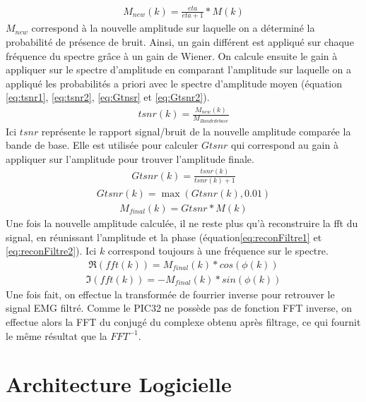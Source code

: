 \documentclass[letterpaper, twoside, 12pt, memoire, creativecommons, hyperref]{thETS}
\begin{document}
\begin{align}\label{eq:newMagEta}
   M_{new}(k) = \frac{eta}{eta+1} * M(k)
\end{align}
$M_{new}$ correspond à la nouvelle amplitude sur laquelle on a déterminé la probabilité de présence de bruit. Ainsi, un gain différent est appliqué sur chaque fréquence du spectre grâce à un gain de Wiener. On calcule ensuite le gain à appliquer sur le spectre d'amplitude en comparant l'amplitude sur laquelle on a appliqué les probabilités a priori avec le spectre d'amplitude moyen (équation \ref{eq:tsnr1}, \ref{eq:tsnr2}, \ref{eq:Gtnsr} et \ref{eq:Gtsnr2}).
\begin{align}\label{eq:tsnr1}
   tsnr(k) = \frac{M_{new}(k)}{M_{Bande de base}}
\end{align}
Ici $tsnr$ représente le rapport signal/bruit de la nouvelle amplitude comparée la bande de base. Elle est utilisée pour calculer $Gtsnr$ qui correspond au gain à appliquer sur l'amplitude pour trouver l'amplitude finale.
\begin{align}\label{eq:tsnr2}
   Gtsnr(k) = \frac{tsnr(k)}{tsnr(k)+1}
\end{align}
\begin{align}\label{eq:Gtnsr}
   Gtsnr(k) = \max(Gtsnr(k), 0.01)
\end{align}
\begin{align}\label{eq:Gtsnr2}
   M_{final}(k) = Gtsnr * M(k)
\end{align}
Une fois la nouvelle amplitude calculée, il ne reste plus qu'à reconstruire la fft du signal, en réunissant l'amplitude et la phase (équation\ref{eq:reconFiltre1} et \ref{eq:reconFiltre2}). Ici $k$ correspond toujours à une fréquence sur le spectre.
\begin{align}\label{eq:reconFiltre1}
   \Re(fft(k)) = M_{final}(k) * cos(\phi(k))
\end{align}
\begin{align}\label{eq:reconFiltre2}
   \Im(fft(k)) = -M_{final}(k) * sin(\phi(k))
\end{align}
Une fois fait, on effectue la transformée de fourrier inverse pour retrouver le signal EMG filtré. Comme le PIC32 ne possède pas de fonction FFT inverse, on effectue alors la FFT du conjugé du complexe obtenu après filtrage, ce qui fournit le même résultat que la $FFT^{-1}$.

\section{Architecture Logicielle}
\end{document}
